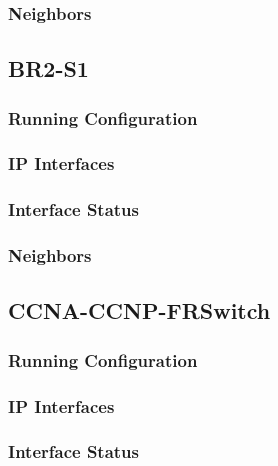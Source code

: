\subsubsection{Neighbors}


\subsection{BR2-S1}
\subsubsection{Running Configuration}


\subsubsection{IP Interfaces}


\subsubsection{Interface Status}


\subsubsection{Neighbors}


\subsection{CCNA-CCNP-FRSwitch}
\subsubsection{Running Configuration}


\subsubsection{IP Interfaces}


\subsubsection{Interface Status}


